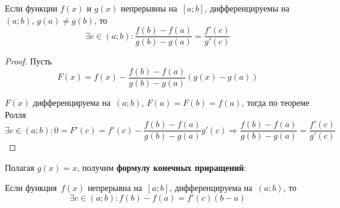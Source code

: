 \begin{theorem}
\label{th:Cauchy's_mean_value}
Если функции $f(x)$ и $g(x)$ непрерывны на~$[a; b]$, дифференцируемы на~$(a; b)$, $g(a) \neq g(b)$, то
\begin{equation*}
\exists c \in (a; b) \colon \frac{f(b) - f(a)}{g(b) - g(a)} = \frac{f'(c)}{g'(c)}
\end{equation*}
\end{theorem}
\begin{proof}
Пусть
\begin{equation*}
F(x) = f(x) - \frac{f(b) - f(a)}{g(b) - g(a)}(g(x) - g(a))
\end{equation*}

$F(x)$ дифференцируема на~$(a; b)$, $F(a) = F(b) = f(a)$, тогда по теореме Ролля
\begin{equation*}
\exists c \in (a; b) \colon 0 = F'(c) = f'(c) - \frac{f(b) - f(a)}{g(b) - g(a)} g'(c) \Rightarrow
\frac{f(b) - f(a)}{g(b) - g(a)} = \frac{f'(c)}{g'(c)}
\end{equation*}
\end{proof}

 Полагая $g(x) = x$, получим \textbf{формулу конечных приращений}:
\begin{theorem}
\label{th:mean_value}
Если функция~$f(x)$ непрерывна на~$[a; b]$, дифференцируема на~$(a; b)$, то
\begin{equation*}
\exists c \in (a; b) \colon f(b) - f(a) = f'(c)(b - a)
\end{equation*}
\end{theorem}

\begin{center}
\end{center}

